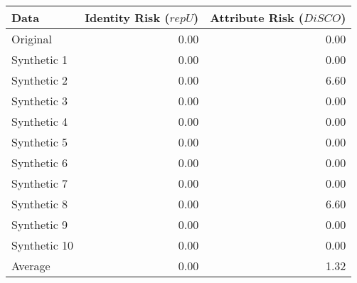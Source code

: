 \begin{tabular}{lrr}
  \toprule
Data & Identity Risk ($repU$) & Attribute Risk ($DiSCO$) \\ 
  \midrule
Original & 0.00 & 0.00 \\ 
  Synthetic 1 & 0.00 & 0.00 \\ 
  Synthetic 2 & 0.00 & 6.60 \\ 
  Synthetic 3 & 0.00 & 0.00 \\ 
  Synthetic 4 & 0.00 & 0.00 \\ 
  Synthetic 5 & 0.00 & 0.00 \\ 
  Synthetic 6 & 0.00 & 0.00 \\ 
  Synthetic 7 & 0.00 & 0.00 \\ 
  Synthetic 8 & 0.00 & 6.60 \\ 
  Synthetic 9 & 0.00 & 0.00 \\ 
  Synthetic 10 & 0.00 & 0.00 \\ 
   \midrule 
Average & 0.00 & 1.32 \\ 
   \bottomrule
\end{tabular}
